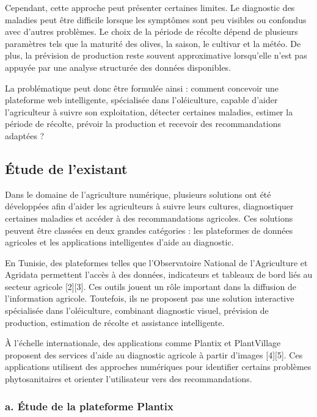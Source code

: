 \documentclass[12pt,a4paper]{report}
\begin{document}
Cependant, cette approche peut présenter certaines limites. Le diagnostic des maladies peut être difficile lorsque les symptômes sont peu visibles ou confondus avec d'autres problèmes. Le choix de la période de récolte dépend de plusieurs paramètres tels que la maturité des olives, la saison, le cultivar et la météo. De plus, la prévision de production reste souvent approximative lorsqu'elle n'est pas appuyée par une analyse structurée des données disponibles.

La problématique peut donc être formulée ainsi : comment concevoir une plateforme web intelligente, spécialisée dans l'oléiculture, capable d'aider l'agriculteur à suivre son exploitation, détecter certaines maladies, estimer la période de récolte, prévoir la production et recevoir des recommandations adaptées ?

\subsection{Étude de l'existant}

Dans le domaine de l'agriculture numérique, plusieurs solutions ont été développées afin d'aider les agriculteurs à suivre leurs cultures, diagnostiquer certaines maladies et accéder à des recommandations agricoles. Ces solutions peuvent être classées en deux grandes catégories : les plateformes de données agricoles et les applications intelligentes d'aide au diagnostic.

En Tunisie, des plateformes telles que l'Observatoire National de l'Agriculture et Agridata permettent l'accès à des données, indicateurs et tableaux de bord liés au secteur agricole [2][3]. Ces outils jouent un rôle important dans la diffusion de l'information agricole. Toutefois, ils ne proposent pas une solution interactive spécialisée dans l'oléiculture, combinant diagnostic visuel, prévision de production, estimation de récolte et assistance intelligente.

À l'échelle internationale, des applications comme Plantix et PlantVillage proposent des services d'aide au diagnostic agricole à partir d'images [4][5]. Ces applications utilisent des approches numériques pour identifier certains problèmes phytosanitaires et orienter l'utilisateur vers des recommandations.

\subsubsection*{a. Étude de la plateforme Plantix}
\end{document}
